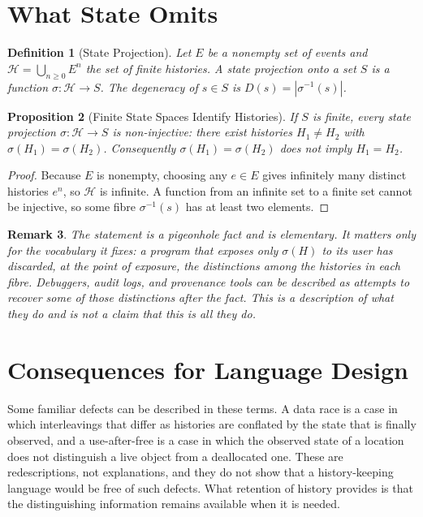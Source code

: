 \documentclass[12pt,oneside,openany]{book}
\theoremstyle{spherepop}
\newtheorem{definition}{Definition}[chapter]
\newtheorem{proposition}[definition]{Proposition}
\theoremstyle{remarkstyle}
\newtheorem{remark}[definition]{Remark}
\newcommand{\calH}{\mathcal{H}}
\begin{document}
\section{What State Omits}

\begin{definition}[State Projection]
\label{def:degeneracy}
Let $E$ be a nonempty set of events and $\calH = \bigcup_{n\ge 0} E^n$ the set of finite histories. A \emph{state projection} onto a set $S$ is a function $\sigma:\calH\to S$. The \emph{degeneracy} of $s\in S$ is $D(s)=|\sigma^{-1}(s)|$.
\end{definition}

\begin{proposition}[Finite State Spaces Identify Histories]
\label{prop:state-illusion}
If $S$ is finite, every state projection $\sigma:\calH\to S$ is non-injective: there exist histories $H_1\neq H_2$ with $\sigma(H_1)=\sigma(H_2)$. Consequently $\sigma(H_1)=\sigma(H_2)$ does not imply $H_1=H_2$.
\end{proposition}

\begin{proof}
Because $E$ is nonempty, choosing any $e\in E$ gives infinitely many distinct histories $e^n$, so $\calH$ is infinite. A function from an infinite set to a finite set cannot be injective, so some fibre $\sigma^{-1}(s)$ has at least two elements.
\end{proof}

\begin{remark}
The statement is a pigeonhole fact and is elementary. It matters only for the vocabulary it fixes: a program that exposes only $\sigma(H)$ to its user has discarded, at the point of exposure, the distinctions among the histories in each fibre. Debuggers, audit logs, and provenance tools can be described as attempts to recover some of those distinctions after the fact. This is a description of what they do and is not a claim that this is all they do.
\end{remark}

\section{Consequences for Language Design}

Some familiar defects can be described in these terms. A data race is a case in which interleavings that differ as histories are conflated by the state that is finally observed, and a use-after-free is a case in which the observed state of a location does not distinguish a live object from a deallocated one. These are redescriptions, not explanations, and they do not show that a history-keeping language would be free of such defects. What retention of history provides is that the distinguishing information remains available when it is needed.
\end{document}
